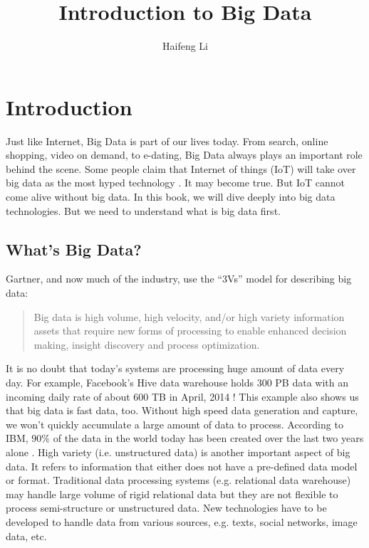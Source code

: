 \documentclass[11pt]{book}
\begin{document}


\title{Introduction to Big Data}

\author{Haifeng Li}



\frontmatter                            %
\maketitle                              %
\tableofcontents                        %
\mainmatter   


\chapter[Introduction]
{Introduction}
Just like Internet, Big Data is part of our lives today. From search, online shopping, video on demand, to e-dating, Big Data always plays an important role behind the scene.
Some people claim that Internet of things (IoT) will take over big data as the most hyped technology \cite{Gartner2014}. It may become true. But IoT cannot come alive without big data.
In this book, we will dive deeply into big data technologies. But we need to understand what is big data first.

\section{What's Big Data?}
Gartner, and now much of the industry, use the ``3Vs'' model \cite{Laney2012} for describing big data:
\begin{quote}
Big data is high volume, high velocity, and/or high variety information assets that require new forms of processing to enable enhanced decision making, insight discovery and process optimization.
\end{quote}
It is no doubt that today's systems are processing huge amount of data every day. For example, Facebook's Hive data warehouse holds 300 PB data with an incoming daily rate of about 600 TB in April, 2014 \cite{VagateWilfong2014}! This example also shows us that big data is fast data, too. Without high speed data generation and capture, we won't quickly accumulate a large amount of data to process. According to IBM, $90\%$ of the data in the world today has been created over the last two years alone \cite{IBM2013}. High variety (i.e. unstructured data) is another important aspect of big data. It refers to information that either does not have a pre-defined data model or format. Traditional data processing systems (e.g. relational data warehouse) may handle large volume of rigid relational data but they are not flexible to process semi-structure or unstructured data. New technologies have to be developed to handle data from various sources, e.g. texts, social networks, image data, etc.
\end{document}

